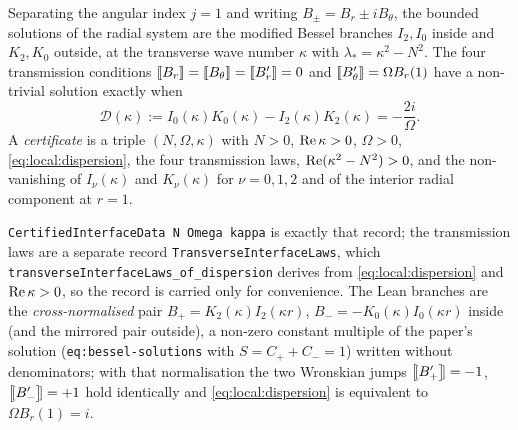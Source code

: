 \begin{definition}
  \label{def:local:dispersion}
  \leanok
  Separating the angular index $j=1$ and writing $B_\pm=B_r\pm iB_\theta$, the bounded
  solutions of the radial system are the modified Bessel branches $I_2,I_0$ inside and
  $K_2,K_0$ outside, at the transverse wave number $\kappa$ with
  $\lambda_*=\kappa^2-N^2$.  The four transmission conditions
  $\left[\![B_r\right]\!]=\left[\![B_\theta\right]\!]=\left[\![B_r'\right]\!]=0$ and $\left[\![B_\theta'\right]\!]=\Omega B_r(1)$ have a
  non-trivial solution exactly when
  \begin{equation}
    \mathcal D(\kappa):=I_0(\kappa)K_0(\kappa)-I_2(\kappa)K_2(\kappa)
    =-\frac{2i}{\Omega}.
    \label{eq:local:dispersion}
  \end{equation}
  A \emph{certificate} is a triple $(N,\Omega,\kappa)$ with $N>0$, $\operatorname{Re}\kappa>0$,
  $\Omega>0$, \eqref{eq:local:dispersion}, the four transmission laws,
  $\operatorname{Re}(\kappa^2-N^2)>0$, and the non-vanishing of $I_\nu(\kappa)$ and $K_\nu(\kappa)$ for
  $\nu=0,1,2$ and of the interior radial component at $r=1$.
\end{definition}

\texttt{CertifiedInterfaceData N Omega kappa} is exactly that record; the transmission laws
are a separate record \texttt{TransverseInterfaceLaws}, which
\texttt{transverseInterfaceLaws\_of\_dispersion} derives from
\eqref{eq:local:dispersion} and $\operatorname{Re}\kappa>0$, so the record is carried only for
convenience.  The Lean branches are the \emph{cross-normalised} pair
$B_+=K_2(\kappa)I_2(\kappa r)$, $B_-=-K_0(\kappa)I_0(\kappa r)$ inside (and the mirrored
pair outside), a non-zero constant multiple of the paper's solution
(\texttt{eq:bessel-solutions} with $S=C_++C_-=1$) written without denominators; with that
normalisation the two Wronskian jumps
$\left[\![B_+'\right]\!]=-1$, $\left[\![B_-'\right]\!]=+1$ hold identically and
\eqref{eq:local:dispersion} is equivalent to $\Omega B_r(1)=i$.

